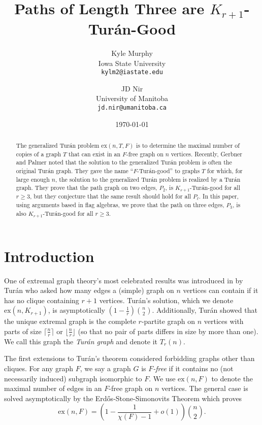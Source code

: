 \documentclass[12pt]{article}
\newcommand{\ext}{\text{ex}}
\begin{document}
\title{Paths of Length Three are $K_{r+1}$-Tur\'an-Good}
\date{\today}
\author{Kyle Murphy\\
\small{Iowa State University}\\
\small{\texttt{kylm2@iastate.edu}}
 \and 
JD Nir\\
\small{University of Manitoba}\\
\small{\texttt{jd.nir@umanitoba.ca}}
}
\maketitle

\begin{abstract}
The generalized Tur\'an problem $\ext(n,T,F)$ is to determine the maximal number
of copies of a graph $T$ that can exist in an $F$-free graph on $n$ vertices.
Recently, Gerbner and Palmer noted that the solution to the generalized Tur\'an
problem is often the original Tur\'an graph. They gave the name
``$F$-Tur\'an-good'' to graphs $T$ for which, for large enough $n$, the solution
to the generalized Tur\'an problem is realized by a Tur\'an graph. They prove
that the path graph on two edges, $P_2$, is $K_{r+1}$-Tur\'an-good for all $r
\ge 3$, but they conjecture that the same result should hold for all $P_\ell$.
In this paper, using arguments based in flag algebras, we prove that the path on
three edges, $P_3$, is also $K_{r+1}$-Tur\'an-good for all $r \ge 3$.
\end{abstract}

\section{Introduction}

One of extremal graph theory's most celebrated results was introduced in
\cite{Turan} by Tur\'an who asked how many edges a (simple) graph on $n$ vertices can contain if
it has no clique containing $r+1$ vertices. Tur\'an's solution, which we
denote $\ext(n, K_{r+1})$, is asymptotically $(1-\frac{1}{r})\binom{n}{2}$. Additionally, Tur\'{a}n showed that the unique extremal graph is the complete $r$-partite graph on $n$
vertices with parts of size $\lceil \frac{n}{r} \rceil$ or $\lfloor \frac{n}{r}
\rfloor$ (so that no pair of parts differs in size by more than one). We call this
graph the \emph{Tur\'an graph} and denote it $T_r(n)$.

The first extensions to Tur\'an's theorem considered forbidding graphs other
than cliques. For any graph $F$, we say a graph $G$ is \emph{$F$-free} if it
contains no (not necessarily induced) subgraph isomorphic to $F$. We use
$\ext(n,F)$ to denote the maximal number of edges in an $F$-free graph on $n$
vertices. The general case is solved asymptotically by the
Erd\H{o}s-Stone-Simonovits Theorem \cite{ErdosSimonovits} which proves
\[ \ext(n,F) = \left(1-\frac{1}{\chi(F)-1}+o(1)\right)\binom{n}{2}. \]
\end{document}
